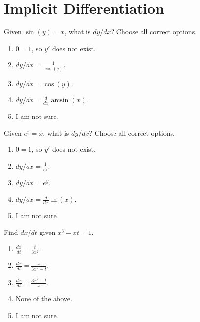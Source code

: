 \documentclass[14pt]{beamer}
\begin{document}
\section{Implicit Differentiation}
\begin{frame}
  Given \(\sin(y) = x\), what is \(dy/dx\)? Choose all correct options.

  \medskip
  \begin{enumerate} 
    \item \(0 = 1\), so \(y'\) does not exist.
    \item \(dy/dx = \tfrac{1}{\cos(y)}\).
    \item \(dy/dx = \cos(y)\).
    \item \(dy/dx = \tfrac{d}{dx} \arcsin(x)\).
    \item I am not sure.
  \end{enumerate} 
\end{frame}


\begin{frame}
  Given \(e^{y} = x\), what is \(dy/dx\)? Choose all correct options.

  \medskip
  \begin{enumerate} 
    \item \(0 = 1\), so \(y'\) does not exist.
    \item \(dy/dx = \tfrac{1}{e^{y}}\).
    \item \(dy/dx = e^{y}\).
    \item \(dy/dx = \tfrac{d}{dx} \ln(x)\).
    \item I am not sure.
  \end{enumerate} 
\end{frame}


\begin{frame}
  Find \(dx/dt\) given \(x^{3} - xt = 1\).

  \medskip
  \begin{enumerate} 
    \item \(\frac{dx}{dt} = \frac{t}{3x^{2}}\).
    \item \(\frac{dx}{dt} = \frac{x}{3x^{2} - t}\).
    \item \(\frac{dx}{dt} = \frac{3x^{2} - t}{x}\).
    \item None of the above.
    \item I am not sure.
  \end{enumerate} 
\end{frame}
\end{document}
